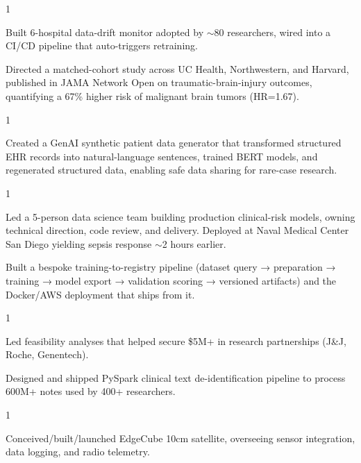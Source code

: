 \documentclass[letterpaper, 11pt]{resume}
\begin{document}
\begin{entryList}{1}
	\item Built 6-hospital data-drift monitor adopted by $\sim$80 researchers, wired into a CI/CD pipeline that auto-triggers retraining.
  \item Directed a matched-cohort study across UC Health, Northwestern, and Harvard, published in JAMA Network Open on traumatic-brain-injury outcomes, quantifying a 67\% higher risk of malignant brain tumors (HR=1.67).
\end{entryList}

\begin{entryList}{1}
	\item Created a GenAI synthetic patient data generator that transformed structured EHR records into natural-language sentences, trained BERT models, and regenerated structured data, enabling safe data sharing for rare-case research.
\end{entryList}

\begin{entryList}{1}
    \item Led a 5-person data science team building production clinical-risk models, owning technical direction, code review, and delivery. Deployed at Naval Medical Center San Diego yielding sepsis response $\sim$2 hours earlier.
    \item Built a bespoke training-to-registry pipeline (dataset query → preparation → training → model export → validation scoring → versioned artifacts) and the Docker/AWS deployment that ships from it.
\end{entryList}

\begin{entryList}{1}
	\item Led feasibility analyses that helped secure \$5M+ in research partnerships (J\&J, Roche, Genentech).
  \item Designed and shipped PySpark clinical text de-identification pipeline to process 600M+ notes used by 400+ researchers.
\end{entryList}

\begin{entryList}{1}
	\item Conceived/built/launched EdgeCube 10cm satellite, overseeing sensor integration, data logging, and radio telemetry.
\end{entryList}
\end{document}

